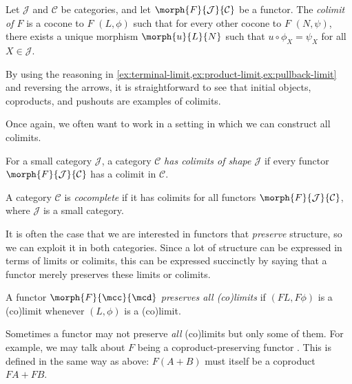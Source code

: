 \begin{definition}[Colimit]
    Let \(\mathcal{J}\) and \(\mathcal{C}\) be categories, and let
    \(\morph{F}{\mathcal{J}}{\mathcal{C}}\) be a functor.
    The \emph{colimit of \(F\)} is a cocone to \(F\) \((L,\phi)\) such that for
    every other cocone to \(F\) \((N, \psi)\), there exists a unique morphism
    \(\morph{u}{L}{N}\) such that \(u \circ \phi_X = \psi_X\) for all
    \(X \in \mathcal{J}\).
    \begin{center}
        
    \end{center}
\end{definition}

\begin{example}
    By using the reasoning in
    \cref{ex:terminal-limit,ex:product-limit,ex:pullback-limit} and reversing
    the arrows, it is straightforward to see that initial objects, coproducts,
    and pushouts are examples of colimits.
\end{example}

Once again, we often want to work in a setting in which we can construct all
colimits.

\begin{definition}
    For a small category \(\mathcal{J}\), a category \(\mathcal{C}\)
    \emph{has colimits of shape \(\mathcal{J}\)} if every functor
    \(\morph{F}{\mathcal{J}}{\mathcal{C}}\) has a colimit in \(\mathcal{C}\).
\end{definition}

\begin{definition}
    A category \(\mathcal{C}\) is \emph{cocomplete} if it has colimits for all
    functors \(\morph{F}{\mathcal{J}}{\mathcal{C}}\), where \(\mathcal{J}\) is a
    small category.
\end{definition}

It is often the case that we are interested in functors that \emph{preserve}
structure, so we can exploit it in both categories.
Since a lot of structure can be expressed in terms of limits or colimits, this
can be expressed succinctly by saying that a functor merely preserves these
limits or colimits.

\begin{definition}
    A functor \(\morph{F}{\mcc}{\mcd}\) \emph{preserves all (co)limits} if
    \((FL,F\phi)\) is a (co)limit whenever \((L,\phi)\) is a (co)limit.
\end{definition}

Sometimes a functor may not preserve \emph{all} (co)limits but only some of
them.
For example, we may talk about \(F\) being a coproduct-preserving functor .
This is defined in the same way as above: \(F(A+B)\) must itself be a coproduct
\(FA + FB\).